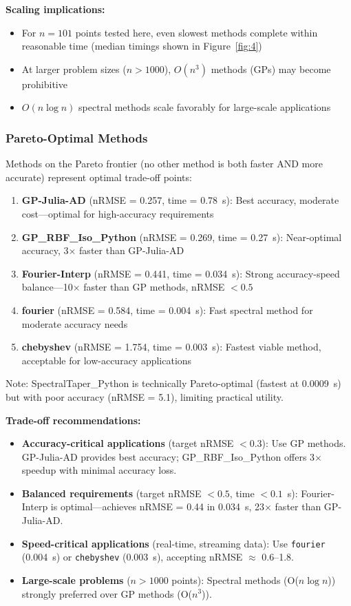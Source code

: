 \textbf{Scaling implications:}
\begin{itemize}
    \item For $n=101$ points tested here, even slowest methods complete within reasonable time (median timings shown in Figure~\ref{fig:4})
    \item At larger problem sizes ($n > 1000$), $O(n^3)$ methods (GPs) may become prohibitive
    \item $O(n \log n)$ spectral methods scale favorably for large-scale applications
\end{itemize}

\subsubsection{Pareto-Optimal Methods}
\label{sec:pareto_optimal}

Methods on the Pareto frontier (no other method is both faster AND more accurate) represent optimal trade-off points:

\begin{enumerate}
    \item \textbf{GP-Julia-AD} (nRMSE = 0.257, time = 0.78~s): Best accuracy, moderate cost—optimal for high-accuracy requirements
    \item \textbf{GP\_RBF\_Iso\_Python} (nRMSE = 0.269, time = 0.27~s): Near-optimal accuracy, 3$\times$ faster than GP-Julia-AD
    \item \textbf{Fourier-Interp} (nRMSE = 0.441, time = 0.034~s): Strong accuracy-speed balance—10$\times$ faster than GP methods, nRMSE $< 0.5$
    \item \textbf{fourier} (nRMSE = 0.584, time = 0.004~s): Fast spectral method for moderate accuracy needs
    \item \textbf{chebyshev} (nRMSE = 1.754, time = 0.003~s): Fastest viable method, acceptable for low-accuracy applications
\end{enumerate}

Note: SpectralTaper\_Python is technically Pareto-optimal (fastest at 0.0009~s) but with poor accuracy (nRMSE = 5.1), limiting practical utility.

\textbf{Trade-off recommendations:}
\begin{itemize}
    \item \textbf{Accuracy-critical applications} (target nRMSE $< 0.3$): Use GP methods. GP-Julia-AD provides best accuracy; GP\_RBF\_Iso\_Python offers 3$\times$ speedup with minimal accuracy loss.
    \item \textbf{Balanced requirements} (target nRMSE $< 0.5$, time $< 0.1$~s): Fourier-Interp is optimal—achieves nRMSE = 0.44 in 0.034~s, 23$\times$ faster than GP-Julia-AD.
    \item \textbf{Speed-critical applications} (real-time, streaming data): Use \texttt{fourier} (0.004~s) or \texttt{chebyshev} (0.003~s), accepting nRMSE $\approx$ 0.6--1.8.
    \item \textbf{Large-scale problems} ($n > 1000$ points): Spectral methods (O($n \log n$)) strongly preferred over GP methods (O($n^3$)).
\end{itemize}

